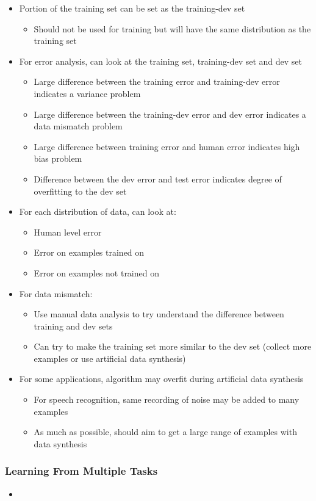 \documentclass[12pt, letterpaper]{article}
\begin{document}
\begin{itemize}
        \item Portion of the training set can be set as the training-dev set
        \begin{itemize}
            \item Should not be used for training but will have the same distribution as the training set
        \end{itemize}
        \item For error analysis, can look at the training set, training-dev set and dev set
        \begin{itemize}
            \item Large difference between the training error and training-dev error indicates a variance problem
            \item Large difference between the training-dev error and dev error indicates a data mismatch problem
            \item Large difference between training error and human error indicates high bias problem
            \item Difference between the dev error and test error indicates degree of overfitting to the dev set
        \end{itemize}
        \item For each distribution of data, can look at:
        \begin{itemize}
            \item Human level error
            \item Error on examples trained on 
            \item Error on examples not trained on
        \end{itemize}
        \item For data mismatch:
        \begin{itemize}
            \item Use manual data analysis to try understand the difference between training and dev sets
            \item Can try to make the training set more similar to the dev set (collect more examples or use artificial data synthesis)
        \end{itemize}
        \item For some applications, algorithm may overfit during artificial data synthesis
        \begin{itemize}
            \item For speech recognition, same recording of noise may be added to many examples
            \item As much as possible, should aim to get a large range of examples with data synthesis
        \end{itemize}
    \end{itemize}
    \subsubsection{Learning From Multiple Tasks}
    \begin{itemize}
        \item 
    \end{itemize}
    
\end{document}
